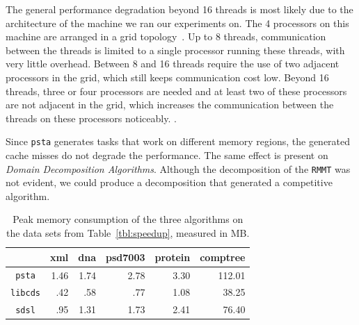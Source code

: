 The general performance degradation beyond 16 threads is most likely due
to the architecture of the machine we ran our experiments on.
The 4 processors on this machine are arranged in a grid
topology~\cite{Drepper2007}.
Up to 8 threads, communication between the threads is limited to a single
processor running these threads, with very little overhead.
Between 8 and 16 threads require the use of two adjacent processors in
the grid, which still keeps communication cost low.
Beyond 16 threads, three or four processors are needed and at least two
of these processors are not adjacent in the grid, which increases the
communication between the threads on these processors noticeably.
.

Since {\tt psta} generates tasks that work on different memory
regions, the generated cache misses  do
not degrade the performance. The same effect is present on
\emph{Domain Decomposition Algorithms}. Although the decomposition of
the {\tt RMMT} was not evident, we could produce a decomposition that
generated a competitive algorithm.
	
\begin{table}[ht]
  \centering
  \begin{tabular}{crrrrr}
\hline
    & xml & dna & psd7003 & protein & comptree\\
\hline
 \verb|psta|   &  1.46  &  1.74  & 2.78  &  3.30 & 112.01\\
 \verb|libcds|   &  .42 &  .58 & .77 &  1.08 & 38.25\\
 \verb|sdsl|   &  .95 &  1.31 & 1.73 &  2.41 & 76.40\\
 \hline
\end{tabular}
\caption{Peak memory consumption of the three algorithms on the data sets
  from Table~\ref{tbl:speedup}, measured in MB.}
\label{tbl:memory_consumption}
\end{table}

